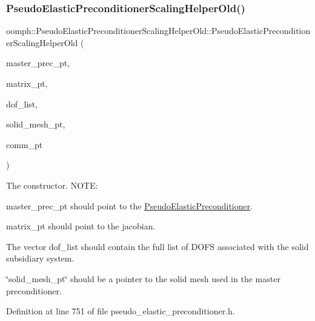\subsubsection{\texorpdfstring{Pseudo\+Elastic\+Preconditioner\+Scaling\+Helper\+Old()}{PseudoElasticPreconditionerScalingHelperOld()}\hspace{0.1cm}{\footnotesize\ttfamily [1/2]}}
{\footnotesize\ttfamily oomph\+::\+Pseudo\+Elastic\+Preconditioner\+Scaling\+Helper\+Old\+::\+Pseudo\+Elastic\+Preconditioner\+Scaling\+Helper\+Old (\begin{DoxyParamCaption}\item[{\hyperlink{classoomph_1_1BlockPreconditioner}{Block\+Preconditioner}$<$ \hyperlink{classoomph_1_1CRDoubleMatrix}{C\+R\+Double\+Matrix} $>$ $\ast$}]{master\+\_\+prec\+\_\+pt,  }\item[{\hyperlink{classoomph_1_1CRDoubleMatrix}{C\+R\+Double\+Matrix} $\ast$}]{matrix\+\_\+pt,  }\item[{\hyperlink{classoomph_1_1Vector}{Vector}$<$ unsigned $>$ \&}]{dof\+\_\+list,  }\item[{const \hyperlink{classoomph_1_1Mesh}{Mesh} $\ast$const}]{solid\+\_\+mesh\+\_\+pt,  }\item[{const \hyperlink{classoomph_1_1OomphCommunicator}{Oomph\+Communicator} $\ast$}]{comm\+\_\+pt }\end{DoxyParamCaption})\hspace{0.3cm}{\ttfamily [inline]}}

The constructor. N\+O\+TE\+:
\begin{DoxyEnumerate}
\item master\+\_\+prec\+\_\+pt should point to the \hyperlink{classoomph_1_1PseudoElasticPreconditioner}{Pseudo\+Elastic\+Preconditioner}.
\item matrix\+\_\+pt should point to the jacobian.
\item The vector dof\+\_\+list should contain the full list of D\+O\+FS associated with the solid subsidiary system.
\item \char`\"{}solid\+\_\+mesh\+\_\+pt\char`\"{} should be a pointer to the solid mesh used in the master preconditioner. 
\end{DoxyEnumerate}

Definition at line 751 of file pseudo\+\_\+elastic\+\_\+preconditioner.\+h.

\mbox{\label{classoomph_1_1PseudoElasticPreconditionerScalingHelperOld_a330a6acc2a56bf439f0b3d603d392cf8}} 
